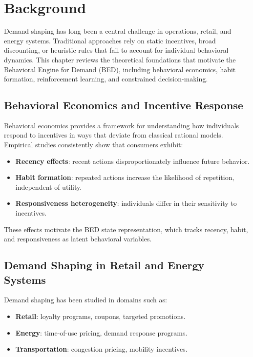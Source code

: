 \chapter{Background}

Demand shaping has long been a central challenge in operations, retail, and
energy systems. Traditional approaches rely on static incentives, broad
discounting, or heuristic rules that fail to account for individual behavioral
dynamics. This chapter reviews the theoretical foundations that motivate the
Behavioral Engine for Demand (BED), including behavioral economics, habit
formation, reinforcement learning, and constrained decision-making.

\section{Behavioral Economics and Incentive Response}

Behavioral economics provides a framework for understanding how individuals
respond to incentives in ways that deviate from classical rational models.
Empirical studies consistently show that consumers exhibit:

\begin{itemize}
    \item \textbf{Recency effects}: recent actions disproportionately influence
    future behavior.
    \item \textbf{Habit formation}: repeated actions increase the likelihood of
    repetition, independent of utility.
    \item \textbf{Responsiveness heterogeneity}: individuals differ in their
    sensitivity to incentives.
\end{itemize}

These effects motivate the BED state representation, which tracks recency,
habit, and responsiveness as latent behavioral variables.

\section{Demand Shaping in Retail and Energy Systems}

Demand shaping has been studied in domains such as:

\begin{itemize}
    \item \textbf{Retail}: loyalty programs, coupons, targeted promotions.
    \item \textbf{Energy}: time-of-use pricing, demand response programs.
    \item \textbf{Transportation}: congestion pricing, mobility incentives.
\end{itemize}

